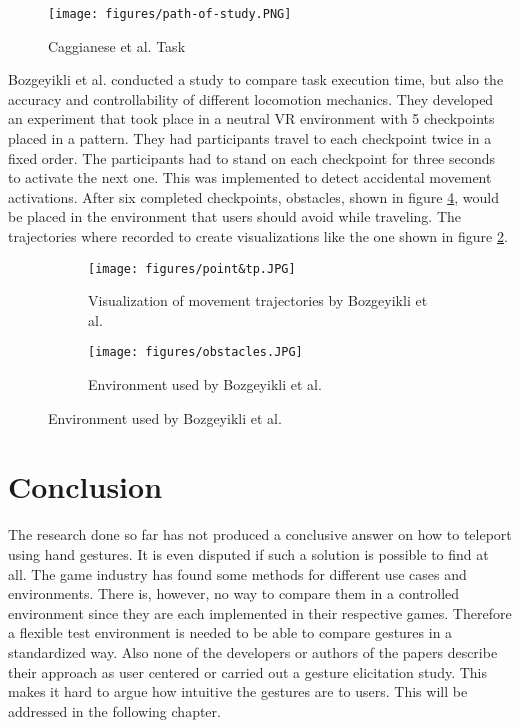 \begin{figure}[hbt!]
  \centering
  \texttt{[image: figures/path-of-study.PNG]}
  \caption{Caggianese et al. \cite{Caggianese} Task}
  \label{fig:path}
\end{figure}

Bozgeyikli et al. \cite{bozgeyikli} conducted a study to compare task execution time, but also the accuracy and controllability of different locomotion mechanics. They developed an experiment that took place in a neutral VR environment with 5 checkpoints placed in a pattern. They had participants travel to each checkpoint twice in a fixed order. The participants had to stand on each checkpoint for three seconds to activate the next one. This was implemented to detect accidental movement activations. After six completed checkpoints, obstacles, shown in figure \ref{fig:obstacles}, would be placed in the environment that users should avoid while traveling. The trajectories where recorded to create visualizations like the one shown in figure \ref{fig:pointandTp}.

\begin{figure}[!h]
  \begin{subfigure}{0.5\textwidth}
  \centering
      \texttt{[image: figures/point\&tp.JPG]}
      \caption{Visualization of movement trajectories by Bozgeyikli et al. \cite{bozgeyikli}}
      \label{fig:pointandTp}
  \end{subfigure}%
  \begin{subfigure}{0.5\textwidth}
  \centering
      \texttt{[image: figures/obstacles.JPG]}
      \caption{Environment used by Bozgeyikli et al. \cite{bozgeyikli}}
      \label{fig:obstacles}
  \end{subfigure}%
\end{figure}

\section{Conclusion}
The research done so far has not produced a conclusive answer on how to teleport using hand gestures. It is even disputed if such a solution is possible to find at all. The game industry has found some methods for different use cases and environments. There is, however, no way to compare them in a controlled environment since they are each implemented in their respective games. Therefore a flexible test environment is needed to be able to compare gestures in a standardized way. Also none of the developers or authors of the papers describe their approach as user centered or carried out a gesture elicitation study. This makes it hard to argue how intuitive the gestures are to users. This will be addressed in the following chapter. 
